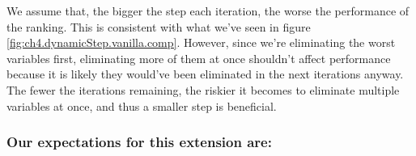 We assume that, the bigger the step each iteration, the worse the performance of the ranking. This is consistent with what we've seen in figure \ref{fig:ch4.dynamicStep.vanilla.comp}. However, since we're eliminating the worst variables first, eliminating more of them at once shouldn't affect performance because it is likely they would've been eliminated in the next iterations anyway. The fewer the iterations remaining, the riskier it becomes to eliminate multiple variables at once, and thus a smaller step is beneficial.

\subsubsection*{Our expectations for this extension are:}

